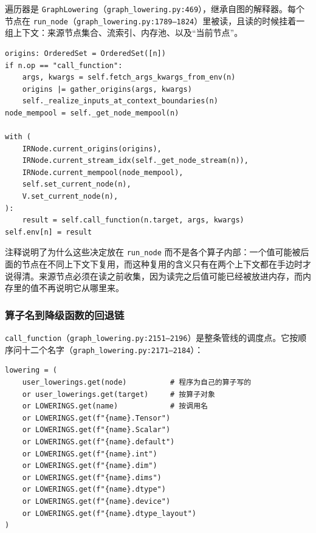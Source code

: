 遍历器是 \texttt{GraphLowering}（\texttt{graph\_lowering.py:469}），继承自图的解释器。每个节点在 \texttt{run\_node}（\texttt{graph\_lowering.py:1789--1824}）里被读，且读的时候挂着一组上下文：来源节点集合、流索引、内存池、以及“当前节点”。

\begin{lstlisting}[caption={\texttt{run\_node} 的上下文（\texttt{graph\_lowering.py:1804--1823}）。}, label=lst:be:runnode, style=pystyle]
origins: OrderedSet = OrderedSet([n])
if n.op == "call_function":
    args, kwargs = self.fetch_args_kwargs_from_env(n)
    origins |= gather_origins(args, kwargs)
    self._realize_inputs_at_context_boundaries(n)
node_mempool = self._get_node_mempool(n)

with (
    IRNode.current_origins(origins),
    IRNode.current_stream_idx(self._get_node_stream(n)),
    IRNode.current_mempool(node_mempool),
    self.set_current_node(n),
    V.set_current_node(n),
):
    result = self.call_function(n.target, args, kwargs)
self.env[n] = result
\end{lstlisting}

注释说明了为什么这些决定放在 \texttt{run\_node} 而不是各个算子内部：一个值可能被后面的节点在不同上下文下复用，而这种复用的含义只有在两个上下文都在手边时才说得清。来源节点必须在读之前收集，因为读完之后值可能已经被放进内存，而内存里的值不再说明它从哪里来。

\subsubsection{算子名到降级函数的回退链}

\texttt{call\_function}（\texttt{graph\_lowering.py:2151--2196}）是整条管线的调度点。它按顺序问十二个名字（\texttt{graph\_lowering.py:2171--2184}）：

\begin{lstlisting}[caption={降级查找链（\texttt{graph\_lowering.py:2171--2184}）。}, label=lst:be:dispatch, style=pystyle]
lowering = (
    user_lowerings.get(node)          # 程序为自己的算子写的
    or user_lowerings.get(target)     # 按算子对象
    or LOWERINGS.get(name)            # 按调用名
    or LOWERINGS.get(f"{name}.Tensor")
    or LOWERINGS.get(f"{name}.Scalar")
    or LOWERINGS.get(f"{name}.default")
    or LOWERINGS.get(f"{name}.int")
    or LOWERINGS.get(f"{name}.dim")
    or LOWERINGS.get(f"{name}.dims")
    or LOWERINGS.get(f"{name}.dtype")
    or LOWERINGS.get(f"{name}.device")
    or LOWERINGS.get(f"{name}.dtype_layout")
)
\end{lstlisting}

